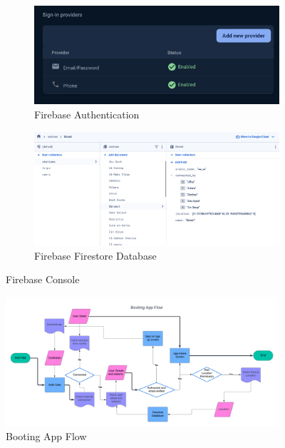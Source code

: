 \documentclass[a4paper, 12pt]{report} %
\begin{document}
            \begin{figure}[H]
                \centering
                \begin{subfigure}{0.7\textwidth}
                    \includegraphics[width=\linewidth]{Images/firebase_auth.png}
                    \caption{Firebase Authentication}
                    \label{fig:firebase_auth}
                \end{subfigure}
                \begin{subfigure}{0.7\textwidth}
                    \includegraphics[width=\linewidth]{Images/firestore.png}
                    \caption{Firebase Firestore Database}
                    \label{fig:firebase_database}
                \end{subfigure}
                \caption{Firebase Console}
                \label{fig:firebase_setup}
            \end{figure}

            \begin{figure}
                \centering
                \includegraphics[width=0.9\textwidth]{Images/auth_flow.png}
                \caption{Booting App Flow}
                \label{fig:auth_flow}
             \end{figure}
\end{document}
